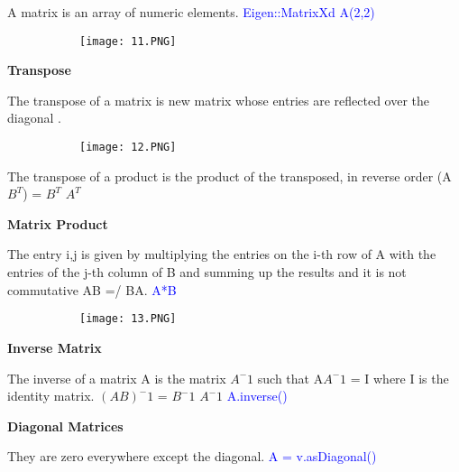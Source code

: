 \documentclass{article}
\begin{document}
A matrix is an array of numeric elements. \textcolor{blue}{Eigen::MatrixXd A(2,2)}

\begin{figure}[ht!]
  \centering
  \begin{subfigure}[b]{0.5\linewidth}
    \texttt{[image: 11.PNG]}
  \end{subfigure}
\end{figure}

\vspace{3mm}
\textbf{Transpose}
\vspace{3mm}

The transpose of a matrix is new matrix whose entries are reflected over the diagonal .

\begin{figure}[ht!]
  \centering
  \begin{subfigure}[b]{0.5\linewidth}
    \texttt{[image: 12.PNG]}
  \end{subfigure}
\end{figure}

The transpose of a product is the product of the transposed, in reverse order (A$B^T$) = $B^T$ $A^T$

\vspace{3mm}
\textbf{Matrix Product}
\vspace{3mm}

The entry i,j is given by multiplying the entries on the i-th row of A with the entries of the j-th column of B and summing up the results and it is not commutative AB =/ BA.
\textcolor{blue}{A*B}

\begin{figure}[ht!]
  \centering
  \begin{subfigure}[b]{0.5\linewidth}
    \texttt{[image: 13.PNG]}
  \end{subfigure}
\end{figure}

\vspace{3mm}
\textbf{Inverse Matrix}
\vspace{3mm}

The inverse of a matrix A is the matrix $A^-1$ such that A$A^-1$ = I where I is the identity matrix.
$(AB)^-1$ = $B^-1$ $A^-1$
\textcolor{blue}{A.inverse()}

\vspace{3mm}
\textbf{Diagonal Matrices}
\vspace{3mm}

They are zero everywhere except the diagonal.
\textcolor{blue}{A = v.asDiagonal()}
\end{document}
